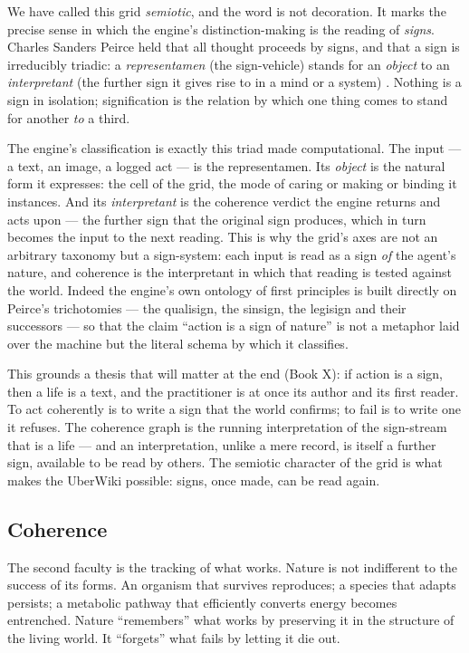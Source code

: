 We have called this grid \emph{semiotic}, and the word is not decoration. It marks
the precise sense in which the engine's distinction-making is the reading of
\emph{signs}. Charles Sanders Peirce held that all thought proceeds by signs, and
that a sign is irreducibly triadic: a \emph{representamen} (the sign-vehicle)
stands for an \emph{object} to an \emph{interpretant} (the further sign it gives
rise to in a mind or a system) \parencite{peirce1992reasoning}. Nothing is a sign
in isolation; signification is the relation by which one thing comes to stand for
another \emph{to} a third.

The engine's classification is exactly this triad made computational. The input
--- a text, an image, a logged act --- is the representamen. Its \emph{object} is
the natural form it expresses: the cell of the grid, the mode of caring or making
or binding it instances. And its \emph{interpretant} is the coherence verdict the
engine returns and acts upon --- the further sign that the original sign produces,
which in turn becomes the input to the next reading. This is why the grid's axes
are not an arbitrary taxonomy but a sign-system: each input is read as a sign
\emph{of} the agent's nature, and coherence is the interpretant in which that
reading is tested against the world. Indeed the engine's own ontology of first
principles is built directly on Peirce's trichotomies --- the qualisign, the
sinsign, the legisign and their successors --- so that the claim ``action is a
sign of nature'' is not a metaphor laid over the machine but the literal schema by
which it classifies.

This grounds a thesis that will matter at the end (Book X): if action is a sign,
then a life is a text, and the practitioner is at once its author and its first
reader. To act coherently is to write a sign that the world confirms; to fail is
to write one it refuses. The coherence graph is the running interpretation of the
sign-stream that is a life --- and an interpretation, unlike a mere record, is
itself a further sign, available to be read by others. The semiotic character of
the grid is what makes the UberWiki possible: signs, once made, can be read again.

\subsection{Coherence}

The second faculty is the tracking of what works. Nature is not indifferent to the
success of its forms. An organism that survives reproduces; a species that adapts
persists; a metabolic pathway that efficiently converts energy becomes entrenched.
Nature ``remembers'' what works by preserving it in the structure of the living
world. It ``forgets'' what fails by letting it die out.


